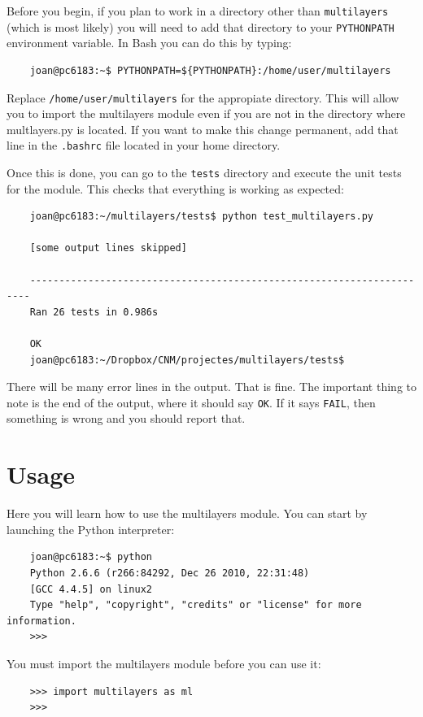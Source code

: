 \documentclass[a4paper,11pt,aps,final]{revtex4}
\begin{document}
Before you begin, if you plan to work in a directory other than \texttt{multilayers} (which is most likely) you will need to add that directory to your \texttt{PYTHONPATH} environment variable. In \textsf{Bash} you can do this by typing:
\begin{verbatim}
    joan@pc6183:~$ PYTHONPATH=${PYTHONPATH}:/home/user/multilayers
\end{verbatim}

Replace \texttt{/home/user/multilayers} for the appropiate directory. This will allow you to import the \textsf{multilayers} module even if you are not in the directory where \textsf{multlayers.py} is located. If you want to make this change permanent, add that line in the \texttt{.bashrc} file located in your home directory.

Once this is done, you can go to the \texttt{tests} directory and execute the unit tests for the module. This checks that everything is working as expected:
\begin{verbatim}
    joan@pc6183:~/multilayers/tests$ python test_multilayers.py

    [some output lines skipped]

    ----------------------------------------------------------------------
    Ran 26 tests in 0.986s

    OK
    joan@pc6183:~/Dropbox/CNM/projectes/multilayers/tests$
\end{verbatim}

There will be many error lines in the output. That is fine. The important thing to note is the end of the output, where it should say \texttt{OK}. If it says \texttt{FAIL}, then something is wrong and you should report that.

\section{Usage}
Here you will learn how to use the \textsf{multilayers} module. You can start by launching the \textsf{Python} interpreter:
\begin{verbatim}
    joan@pc6183:~$ python
    Python 2.6.6 (r266:84292, Dec 26 2010, 22:31:48)
    [GCC 4.4.5] on linux2
    Type "help", "copyright", "credits" or "license" for more information.
    >>>
\end{verbatim}

You must import the \textsf{multilayers} module before you can use it:
\begin{verbatim}
    >>> import multilayers as ml
    >>>
\end{verbatim}
\end{document}

